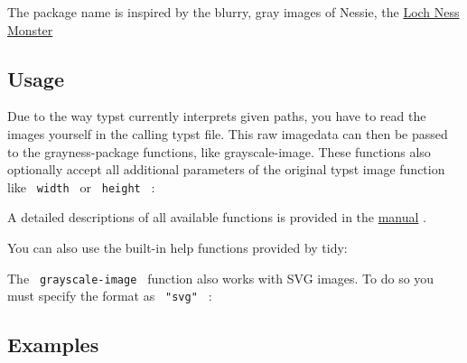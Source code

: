 The package name is inspired by the blurry, gray images of Nessie, the
\href{https://en.wikipedia.org/wiki/Loch_Ness_Monster}{Loch Ness
Monster}

\subsection{Usage}\label{usage}

Due to the way typst currently interprets given paths, you have to read
the images yourself in the calling typst file. This raw imagedata can
then be passed to the grayness-package functions, like grayscale-image.
These functions also optionally accept all additional parameters of the
original typst image function like \texttt{\ width\ } or
\texttt{\ height\ } :

\begin{Shaded}
\begin{Highlighting}[]

\end{Highlighting}
\end{Shaded}

A detailed descriptions of all available functions is provided in the
\href{https://github.com/typst/packages/raw/main/packages/preview/grayness/0.2.0/manual.pdf}{manual}
.

You can also use the built-in help functions provided by tidy:

\begin{Shaded}
\begin{Highlighting}[]
\end{Highlighting}
\end{Shaded}

The \texttt{\ grayscale-image\ } function also works with SVG images. To
do so you must specify the format as \texttt{\ "svg"\ } :

\begin{Shaded}
\begin{Highlighting}[]
\end{Highlighting}
\end{Shaded}

\subsection{Examples}\label{examples}

